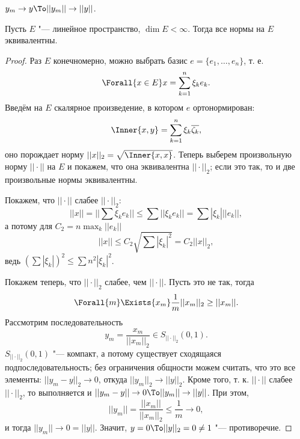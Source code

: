 \documentclass[main]{subfiles}
\begin{document}
\begin{exercise}
  \( y_m \to y \To ||y_m|| \to ||y|| \).
\end{exercise}

\begin{proposition}
  Пусть \( E \) "--- линейное пространство, \( \dim E < \infty \). Тогда все нормы на
  \( E \) эквивалентны.
\end{proposition}
\begin{proof}
  Раз \( E \) конечномерно, можно выбрать базис
  \( e = \{ e_1, \dots, e_n \} \), т. е.
  \[ \Forall{x \in E} x = \sum_{k = 1}^n \xi_k e_k. \]
  Введём на \( E \) скалярное произведение, в котором
  \( e \) ортонормирован:
  \[ \Inner{x, y} = \sum_{k = 1}^n \xi_k \overline{\zeta_k}, \]
  оно порождает норму \( ||x||_2 = \sqrt{\Inner{x, x}} \).
  Теперь выберем произвольную норму \( ||\cdot|| \) на \( E \)
  и покажем, что она эквивалентна \( ||\cdot||_2 \);
  если это так, то и две произвольные нормы эквивалентны.

  Покажем, что \( ||\cdot|| \) слабее \( ||\cdot||_2 \):
  \[
    ||x|| = ||\sum \xi_k e_k|| \le
    \sum ||\xi_k e_k|| = \sum |\xi_k| ||e_k||,
  \]
  а потому для \( C_2 = n \max_k ||e_k|| \)
  \[
    ||x|| \le C_2 \sqrt{\sum |\xi_k|^2} = C_2 ||x||_2,
  \]
  ведь \( {\left( \sum |\xi_k| \right)}^2 \le \sum n^2 |\xi_k|^2 \).

  Покажем теперь, что \( ||\cdot||_2 \) слабее, чем \( ||\cdot|| \).
  Пусть это не так, тогда
  \[
    \Forall{m} \Exists{x_m} \frac{1}{m} ||x_m||_2 \ge ||x_m||.
  \]
  Рассмотрим последовательность 
  \[ y_m = \frac{x_m}{||x_m||_2} \in S_{||\cdot||_2}(0, 1). \]
  \( S_{||\cdot||_2}(0, 1) \) "--- компакт,
  а потому существует сходящаяся подпоследовательность;
  без ограничения общности можем считать,
  что это все элементы: \( ||y_m - y||_2 \to 0 \),
  откуда \( ||y_m||_2 \to ||y||_2 \).
  Кроме того,
  т. к. \( ||\cdot|| \) слабее \( ||\cdot||_2 \),
  то выполняется и \( ||y_m - y|| \to 0 \To ||y_m|| \to ||y|| \).
  При этом,
  \[ ||y_m|| = \frac{||x_m||}{||x_m||_2} \le \frac{1}{m} \to 0, \]
  и тогда \( ||y_m|| \to 0 = ||y|| \).
  Значит, \( y = 0 \To ||y||_2 = 0 \ne 1 \) "---
  противоречие.
\end{proof}
\end{document}

